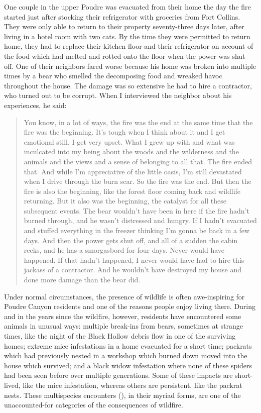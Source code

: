 \documentclass[
]{article}
\begin{document}
One couple in the upper Poudre was evacuated from their home the day the fire started just after stocking their refrigerator with groceries from Fort Collins. They were only able to return to their property seventy-three days later, after living in a hotel room with two cats. By the time they were permitted to return home, they had to replace their kitchen floor and their refrigerator on account of the food which had melted and rotted onto the floor when the power was shut off. One of their neighbors fared worse because his home was broken into multiple times by a bear who smelled the decomposing food and wreaked havoc throughout the house. The damage was so extensive he had to hire a contractor, who turned out to be corrupt. When I interviewed the neighbor about his experiences, he said:

\begin{quote}
You know, in a lot of ways, the fire was the end at the same time that the fire was the beginning. It's tough when I think about it and I get emotional still, I get very upset. What I grew up with and what was inculcated into my being about the woods and the wilderness and the animals and the views and a sense of belonging to all that. The fire ended that. And while I'm appreciative of the little oasis, I'm still devastated when I drive through the burn scar. So the fire was the end. But then the fire is also the beginning, like the forest floor coming back and wildlife returning. But it also was the beginning, the catalyst for all these subsequent events. The bear wouldn't have been in here if the fire hadn't burned through, and he wasn't distressed and hungry. If I hadn't evacuated and stuffed everything in the freezer thinking I'm gonna be back in a few days. And then the power gets shut off, and all of a sudden the cabin reeks, and he has a smorgasbord for four days. Never would have happened. If that hadn't happened, I never would have had to hire this jackass of a contractor. And he wouldn't have destroyed my house and done more damage than the bear did.
\end{quote}

Under normal circumstances, the presence of wildlife is often awe-inspiring for Poudre Canyon residents and one of the reasons people enjoy living there. During and in the years since the wildfire, however, residents have encountered some animals in unusual ways: multiple break-ins from bears, sometimes at strange times, like the night of the Black Hollow debris flow in one of the surviving homes; extreme mice infestations in a home evacuated for a short time; packrats which had previously nested in a workshop which burned down moved into the house which survived; and a black widow infestation where none of these spiders had been seen before over multiple generations. Some of these impacts are short-lived, like the mice infestation, whereas others are persistent, like the packrat nests. These multispecies encounters (), in their myriad forms, are one of the unaccounted-for categories of the consequences of wildfire.
\end{document}
